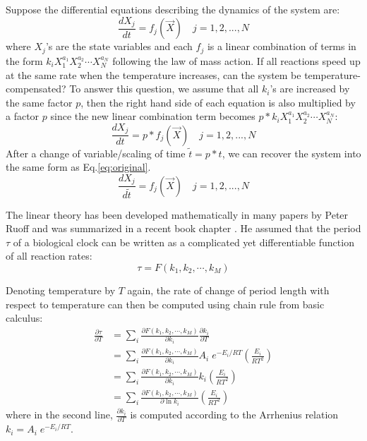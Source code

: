 \documentclass[a4paper,10pt]{article}
\numberwithin{equation}{section}
\begin{document}
Suppose the differential equations describing the dynamics of the system are: 
\begin{equation}\label{eq:original}
\frac{d X_j}{dt} = f_j(\overrightarrow{X})  \quad j=1,2,...,N
\end{equation} 
where $X_j$'s are the state variables and each $f_j$ is a linear combination of terms in the form $k_iX_1^{a_1}X_2^{a_2}\cdots X_N^{a_N}$ following the law of mass action. 
If all reactions speed up at the same rate when the temperature increases, can the system be temperature-compensated? To answer this question, we assume that all $k_i$'s are increased by the same factor $p$, then the right hand side of each equation is also multiplied by a factor $p$ since the new linear combination term becomes $p*k_iX_1^{a_1}X_2^{a_2}\cdots X_N^{a_N}$:
\[
\frac{d X_j}{dt} = p*f_j(\overrightarrow{X})  \quad j=1,2,...,N 
\]
After a change of variable/scaling of time $\tilde{t}=p*t$, we can recover the system into the same form as Eq.\ref{eq:original}.
\begin{equation}
 \frac{d X_j}{d\tilde{t}} = f_j(\overrightarrow{X})  \quad j=1,2,...,N 
\end{equation}

The linear theory has been developed mathematically in many papers by Peter Ruoff and was summarized in a recent book chapter \citet{ruoff2004}. He assumed that the period $\tau$  of a biological clock can be written as a complicated yet differentiable function of all reaction rates:
\begin{equation}
\tau=F(k_1,k_2,\cdots ,k_M)
\end{equation}

Denoting temperature by $T$ again, the rate of change of period length with respect to temperature can then be computed using chain rule from  basic calculus:
\begin{equation}
\begin{split}\label{eq:rateofchange}
\frac{\partial \tau}{\partial T} &= \sum_i \frac{\partial F(k_1,k_2,\cdots ,k_M)}{\partial k_i} \frac{\partial k_i}{\partial T}\\
&=\sum_i \frac{\partial F(k_1,k_2,\cdots ,k_M)}{\partial k_i} A_i\;e^{-E_i/RT}(\frac{E_i}{RT^2})\\
&=\sum_i \frac{\partial F(k_1,k_2,\cdots ,k_M)}{\partial k_i} k_i (\frac{E_i}{RT^2})\\
&=\sum_i \frac{\partial F(k_1,k_2,\cdots ,k_M)}{\partial \ln k_i}  (\frac{E_i}{RT^2})
\end{split}
\end{equation}
where in the second line, $\frac{\partial k_i}{\partial T}$ is computed according to the Arrhenius relation $k_i=A_i\; e^{-E_i/RT}$.
\end{document}
